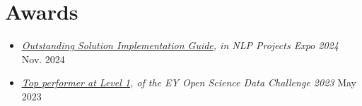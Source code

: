 \documentclass[letterpaper,11pt]{article}
\begin{document}
\section*{Awards}
  \begin{itemize}
    \item \textit{\href{https://drive.google.com/file/d/15Zye0DqQrMwGtM-SLBvWo5tUCdOG-SK7/view?usp=sharing}{\underline{Outstanding Solution Implementation Guide}}, in NLP Projects Expo 2024} \hfill {Nov. 2024}
    \item \textit{\href{https://drive.google.com/file/d/1PQot78NAxoTiHbD7beFBZICgjhwmDwTT/view?usp=sharing}{\underline{Top performer at Level 1}}, of the EY Open Science Data Challenge 2023} \hfill {May 2023}
  \end{itemize}

\end{document}
